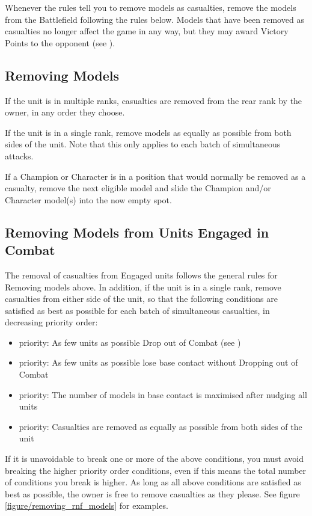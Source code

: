 Whenever the rules tell you to remove models as casualties, remove the models from the Battlefield following the rules below. Models that have been removed as casualties no longer affect the game in any way, but they may award Victory Points to the opponent (see ).

\subsection{Removing \rnf{} Models}

If the unit is in multiple ranks, \rnf{} casualties are removed from the rear rank by the owner, in any order they choose.

If the unit is in a single rank, remove models as equally as possible from both sides of the unit. Note that this only applies to each batch of simultaneous attacks.

If a Champion or Character is in a position that would normally be removed as a casualty, remove the next eligible \rnf{} model and slide the Champion and/or Character model(s) into the now empty spot.

\subsection{Removing \rnf{} Models from Units Engaged in Combat}

The removal of casualties from Engaged units follows the general rules for Removing \rnf{} models above. In addition, if the unit is in a single rank, remove casualties from either side of the unit, so that the following conditions are satisfied as best as possible for each batch of simultaneous casualties, in decreasing priority order:
\begin{itemize}
\item {} priority: As few units as possible Drop out of Combat (see )
\item {} priority: As few units as possible lose base contact without Dropping out of Combat
\item {} priority: The number of models in base contact is maximised after nudging all units
\item {} priority: Casualties are removed as equally as possible from both sides of the unit
\end{itemize}

If it is unavoidable to break one or more of the above conditions, you must avoid breaking the higher priority order conditions, even if this means the total number of conditions you break is higher. As long as all above conditions are satisfied as best as possible, the owner is free to remove casualties as they please. See figure \ref{figure/removing_rnf_models} for examples.


